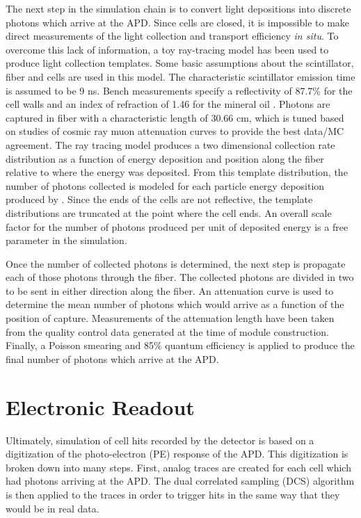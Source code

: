 The next step in the simulation chain is to convert light depositions into discrete photons which arrive at the APD.  Since \nova cells are closed, it is impossible to make direct measurements of the light collection and transport efficiency \textit{in situ}.  To overcome this lack of information, a toy ray-tracing model has been used to produce light collection templates.  Some basic assumptions about the scintillator, fiber and cells are used in this model.  The characteristic scintillator emission time is assumed to be 9 ns.  Bench measurements specify a reflectivity of 87.7\% for the cell walls
\cite{aurisano2015nova}
and an index of refraction of 1.46 for the mineral oil
\cite{mufson2015liquid}.
Photons are captured in fiber with a characteristic length of 30.66 cm, which is tuned based on studies of cosmic ray muon attenuation curves to provide the best data/MC agreement.  The ray tracing model produces a two dimensional collection rate  distribution as a function of energy deposition and position along the fiber relative to where the energy was deposited.  From this template distribution, the number of photons collected is modeled for each particle energy deposition produced by \geant.  Since the ends of the cells are not reflective, the template distributions are truncated at the point where the cell ends.
An overall scale factor for the number of photons produced per unit of deposited energy is a free parameter in the simulation.

Once the number of collected photons is determined, the next step is propagate each of those photons through the fiber.  The collected photons are divided in two to be sent in either direction along the fiber.  An attenuation curve is used to determine the mean number of photons which would arrive as a function of the position of capture.  Measurements of the attenuation length have been taken from the quality control data generated at the time of module construction.  Finally, a Poisson smearing and 85\% quantum efficiency is applied to produce the final number of photons which arrive at the APD.

\section{Electronic Readout}


Ultimately, simulation of cell hits recorded by the detector is based on a digitization of the photo-electron (PE) response of the APD.  This digitization is broken down into many steps.  First, analog traces are created for each cell which had photons arriving at the APD.  The dual correlated sampling (DCS) algorithm is then applied to the traces in order to trigger hits in the same way that they would be in real data.

